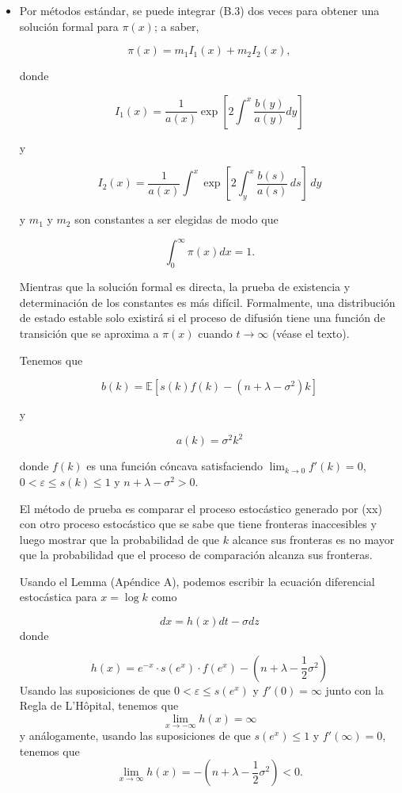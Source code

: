 \documentclass[a4paper,12pt]{article}
\begin{document}
\begin{itemize}
	\item Por métodos estándar, se puede integrar (B.3) dos veces para obtener una solución formal para \(\pi(x)\); a saber,
	
	\[
	\pi(x) = m_1 I_1(x) + m_2 I_2(x),
	\]
	
	donde
	
	\[
	I_1(x) = \frac{1}{a(x)} \exp \left[ 2 \int^x \frac{b(y)}{a(y)} dy \right]
	\]
	
	y
	
	\[
	I_2(x) = \frac{1}{a(x)} \int^x \exp\left[ 2 \int_y^x \frac{b(s)}{a(s)} \, ds \right] \, dy
	\]

	
	y \( m_1 \) y \( m_2 \) son constantes a ser elegidas de modo que
	
	\[
	\int_0^\infty \pi(x)dx = 1.
	\]
	
	Mientras que la solución formal es directa, la prueba de existencia y determinación de los constantes es más difícil. Formalmente, una distribución de estado estable solo existirá si el proceso de difusión tiene una función de transición que se aproxima a \(\pi(x)\) cuando \( t \to \infty \) (véase el texto).
	
	
	
	Tenemos que

	\[
		b(k) = \mathbb{E}[s(k) f(k) - (n + \lambda - \sigma^2) k]
			\]

	y

	\[
		a(k) = \sigma^2 k^2
		\]

	
donde $f(k)$ es una función cóncava satisfaciendo $\lim_{k \to 0} f'(k) = 0$, $0 < \varepsilon \leq s(k) \leq 1$ y $n + \lambda - \sigma^2 > 0$.

	El método de prueba es comparar el proceso estocástico generado por (xx) con otro proceso estocástico que se sabe que tiene fronteras inaccesibles y luego mostrar que la probabilidad de que $k$ alcance sus fronteras es no mayor que la probabilidad que el proceso de comparación alcanza sus fronteras.
	
	Usando el Lemma (Apéndice A), podemos escribir la ecuación diferencial estocástica para $x = \log k$ como
	
\[
dx = h(x) dt - \sigma dz
\]
	donde
	
\[
	h(x) = e^{-x} \cdot s(e^x) \cdot f(e^x) - (n + \lambda - \frac{1}{2} \sigma^2)
\]
	Usando las suposiciones de que $0 < \varepsilon \leq s(e^x)$ y $f'(0) = \infty$ junto con la Regla de L'Hôpital, tenemos que
	\[
		\lim_{x \to -\infty} h(x) = \infty
		\]
	y análogamente, usando las suposiciones de que $s(e^x) \leq 1$ y $f'(\infty) = 0$, tenemos que
\[
		\lim_{x \to \infty} h(x) = - (n + \lambda - \frac{1}{2} \sigma^2) < 0.
\]
	

\end{itemize}
\end{document}
